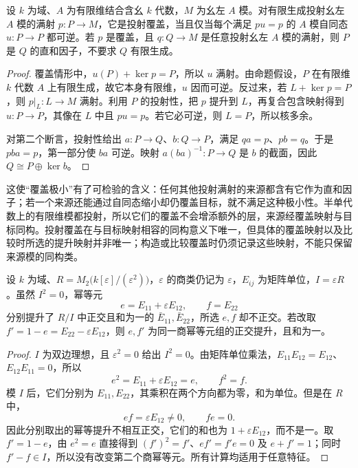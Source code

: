 \begin{proposition}\label{b2:prop:projective-cover-minimality}
	设 \(k\) 为域、\(A\) 为有限维结合含幺 \(k\) 代数，\(M\) 为幺左 \(A\) 模。对有限生成投射幺左 \(A\) 模的满射 \(p:P\to M\)，它是投射覆盖，当且仅当每个满足 \(pu=p\) 的 \(A\) 模自同态 \(u:P\to P\) 都可逆。若 \(p\) 是覆盖，且 \(q:Q\to M\) 是任意投射幺左 \(A\) 模的满射，则 \(P\) 是 \(Q\) 的直和因子，不要求 \(Q\) 有限生成。
\end{proposition}
\begin{proof}
	覆盖情形中，\(u(P)+\ker p=P\)，所以 \(u\) 满射。由命题假设，\(P\) 在有限维 \(k\) 代数 \(A\) 上有限生成，故它本身有限维，\(u\) 因而可逆。反过来，若 \(L+\ker p=P\)，则 \(p|_L:L\to M\) 满射。利用 \(P\) 的投射性，把 \(p\) 提升到 \(L\)，再复合包含映射得到 \(u:P\to P\)，其像在 \(L\) 中且 \(pu=p\)。若它必可逆，则 \(L=P\)，所以核多余。

	对第二个断言，投射性给出 \(a:P\to Q\)、\(b:Q\to P\)，满足 \(qa=p\)、\(pb=q\)。于是 \(pba=p\)，第一部分使 \(ba\) 可逆。映射 \(a(ba)^{-1}:P\to Q\) 是 \(b\) 的截面，因此 \(Q\cong P\oplus\ker b\)。
\end{proof}

这使“覆盖极小”有了可检验的含义：任何其他投射满射的来源都含有它作为直和因子；若一个来源还能通过自同态缩小却仍覆盖目标，就不满足这种极小性。半单代数上的有限维模都投射，所以它们的覆盖不会增添额外的层，来源经覆盖映射与目标同构。投射覆盖在与目标映射相容的同构意义下唯一，但具体的覆盖映射以及比较时所选的提升映射并非唯一；构造或比较覆盖时仍须记录这些映射，不能只保留来源模的同构类。

\begin{proposition}\label{b2:prop:idempotent-lift-compatibility-counterexample}
	设 \(k\) 为域、\(R=M_2\bigl(k[\varepsilon]/(\varepsilon^2)\bigr)\)，\(\varepsilon\) 的商类仍记为 \(\varepsilon\)，\(E_{ij}\) 为矩阵单位，\(I=\varepsilon R\)。虽然 \(I^2=0\)，幂等元
	\[
		e=E_{11}+\varepsilon E_{12},\qquad f=E_{22}
	\]
	分别提升了 \(R/I\) 中正交且和为一的 \(\bar E_{11},\bar E_{22}\)，所选 \(e,f\) 却不正交。若改取 \(f'=1-e=E_{22}-\varepsilon E_{12}\)，则 \(e,f'\) 为同一商幂等元组的正交提升，且和为一。
\end{proposition}
\begin{proof}
	\(I\) 为双边理想，且 \(\varepsilon^2=0\) 给出 \(I^2=0\)。由矩阵单位乘法，\(E_{11}E_{12}=E_{12}\)、\(E_{12}E_{11}=0\)，所以
	\[
		e^2=E_{11}+\varepsilon E_{12}=e,\qquad f^2=f.
	\]
	模 \(I\) 后，它们分别为 \(E_{11},E_{22}\)，其乘积在两个方向都为零，和为单位。但是在 \(R\) 中，
	\[
		ef=\varepsilon E_{12}\ne0,\qquad fe=0.
	\]
	因此分别取出的幂等提升不相互正交，它们的和也为 \(1+\varepsilon E_{12}\)，而不是一。取 \(f'=1-e\)，由 \(e^2=e\) 直接得到 \((f')^2=f'\)、\(ef'=f'e=0\) 及 \(e+f'=1\)；同时 \(f'-f\in I\)，所以没有改变第二个商幂等元。所有计算均适用于任意特征。
\end{proof}
